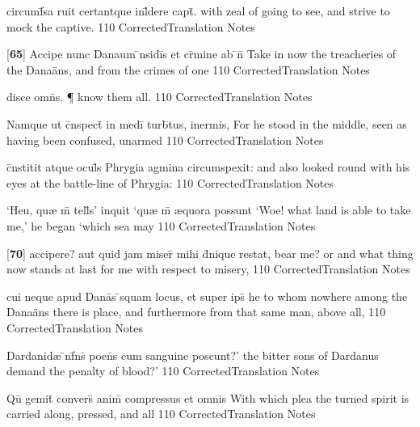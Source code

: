 \latline
  {circumf\={}sa ruit certantque inl\={}dere capt\={}.}
  { with zeal of going to see, and strive to mock the captive. }
  {110}
  { CorrectedTranslation }
  { Notes }


\latline
  {[\textbf{65}] Accipe nunc Danaum \={\macron {\i}}nsidi\={}s et cr\={\macron {\i}}mine ab \={}n\={}}
  { Take in now the treacheries of the Dana\"ans, and from the crimes of one }
  {110}
  { CorrectedTranslation }
  { Notes }


\latline
  {disce omn\={\macron {\i}}s. \P}
  { know them all. }
  {110}
  { CorrectedTranslation }
  { Notes }


\latline
  {Namque ut c\={}nspect\={} in medi\={} turb\={}tus, inermis, }
  { For he stood in the middle, seen as having been confused, unarmed }
  {110}
  { CorrectedTranslation }
  { Notes }


\latline
  {c\={}nstitit atque ocul\={\macron {\i}}s Phrygia agmina circumspexit:}
  { and also looked round with his eyes at the battle-line of Phrygia: }
  {110}
  { CorrectedTranslation }
  { Notes }


\latline
  {`Heu, qu{\ae} m\={} tell\={}s' inquit `qu{\ae} m\={} {\ae}quora possunt}
  { `Woe!  what land is able to take me,' he began `which sea may  }
  {110}
  { CorrectedTranslation }
  { Notes }


\latline
  {[\textbf{70}] accipere? aut quid jam miser\={} mihi d\={}nique restat,}
  { bear me? or and what thing now stands at last for me with respect to misery,  }
  {110}
  { CorrectedTranslation }
  { Notes }


\latline
  {cui neque apud Dana\={}s \={}squam locus, et super ips\={\macron {\i}}}
  { he to whom nowhere among the Dana\"ans there is place, and furthermore from that same man, above all, }
  {110}
  { CorrectedTranslation }
  { Notes }


\latline
  {Dardanid{\ae} \={\macron {\i}}nf\={}ns\={\macron {\i}} poen\={}s cum sanguine poscunt?'}
  { the bitter sons of Dardanus demand the penalty of blood?'  }
  {110}
  { CorrectedTranslation }
  { Notes }


\latline
  {Qu\={} gemit\={} convers\={\macron {\i}} anim\={\macron {\i}} compressus et omnis}
  { With which plea the turned spirit is carried along, pressed, and all  }
  {110}
  { CorrectedTranslation }
  { Notes }


